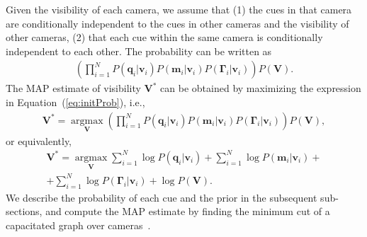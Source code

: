 Given the visibility of each camera, we assume that (1) the cues in that camera are conditionally independent to the cues in other cameras and the visibility of other cameras, (2) that each cue within the same camera is conditionally independent to each other. The probability can be written as
\begin{eqnarray}
\left( \prod_{i=1}^{N} P( \mathbf{q}_i | \mathbf{v}_i )P( \mathbf{m}_i | \mathbf{v}_i) P( \mathbf{\Gamma}_i| \mathbf{v}_i) \right)P(\mathbf{V}).
\label{eq:initProb}
\end{eqnarray}
The MAP estimate of visibility $\mathbf{V}^*$ can be obtained by maximizing the expression in Equation~(\ref{eq:initProb}), i.e., 
\begin{eqnarray}
\mathbf{V^*} = \underset{\mathbf{V}}{\operatorname{argmax}}  \left( \prod_{i=1}^{N} P( \mathbf{q}_i | \mathbf{v}_i )P( \mathbf{m}_i | \mathbf{v}_i)P( \mathbf{\Gamma}_i| \mathbf{v}_i) \right) P(\mathbf{V}), \nonumber
\end{eqnarray}
or equivalently,
\begin{eqnarray}
\mathbf{V^*} =\underset{\mathbf{V}}{\operatorname{argmax}}  \sum_{i=1}^{N} \log P( \mathbf{q}_i | \mathbf{v}_i)  + \sum_{i=1}^{N} \log P( \mathbf{m}_i | \mathbf{v}_i ) +\nonumber\\
+ \sum_{i=1}^{N} \log P( \mathbf{\Gamma}_i| \mathbf{v}_i) + \log P(\mathbf{V}).
\label{eq:goalFunction}
\end{eqnarray}
We describe the probability of each cue and the prior in the subsequent sub-sections, and compute the MAP estimate by finding the minimum cut of a capacitated graph over cameras~\cite{boykov2001fast}. 


